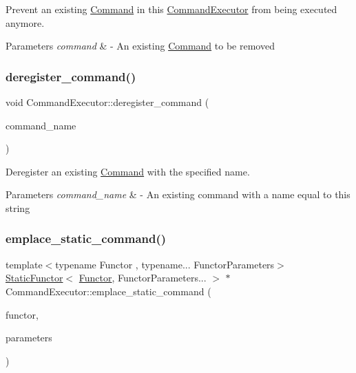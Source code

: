 Prevent an existing \mbox{\hyperlink{class_command}{Command}} in this \mbox{\hyperlink{class_command_executor}{Command\+Executor}} from being executed anymore. 
\begin{DoxyParams}{Parameters}
{\em command} & -\/ An existing \mbox{\hyperlink{class_command}{Command}} to be removed \\
\hline
\end{DoxyParams}
\mbox{\label{class_command_executor_ae4af9df5bdf49a97f3efaf483f53c97b}} 
\subsubsection{\texorpdfstring{deregister\+\_\+command()}{deregister\_command()}\hspace{0.1cm}{\footnotesize\ttfamily [2/2]}}
{\footnotesize\ttfamily void Command\+Executor\+::deregister\+\_\+command (\begin{DoxyParamCaption}\item[{const std\+::string \&}]{command\+\_\+name }\end{DoxyParamCaption})}

Deregister an existing \mbox{\hyperlink{class_command}{Command}} with the specified name. 
\begin{DoxyParams}{Parameters}
{\em command\+\_\+name} & -\/ An existing command with a name equal to this string \\
\hline
\end{DoxyParams}
\mbox{\label{class_command_executor_a745e9fc9e15db7102e50b3b23370fc3d}} 
\subsubsection{\texorpdfstring{emplace\+\_\+static\+\_\+command()}{emplace\_static\_command()}}
{\footnotesize\ttfamily template$<$typename Functor , typename... Functor\+Parameters$>$ \\
\mbox{\hyperlink{class_static_functor}{Static\+Functor}}$<$ \mbox{\hyperlink{class_functor}{Functor}}, Functor\+Parameters... $>$ $\ast$ Command\+Executor\+::emplace\+\_\+static\+\_\+command (\begin{DoxyParamCaption}\item[{\mbox{\hyperlink{class_functor}{Functor}} \&\&}]{functor,  }\item[{Functor\+Parameters \&\&...}]{parameters }\end{DoxyParamCaption})}

